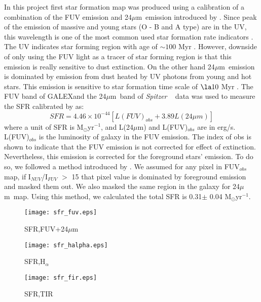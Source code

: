\documentclass[useAMS,usenatbib]{mn2e}
\newcommand \halpha    {H$\alpha $\ }
\newcommand \um    {$\mu$m\ }
\newcommand \Spitzer {{\it Spitzer }}
\newcommand \Galex {GALEX}
\begin{document}
In this project first star formation map was produced using a calibration of a combination of the FUV emission and 24\um emission introduced by \cite{Hao11}. Since peak of the emission of massive and young stars (O - B and A type) are in the UV, this wavelength is one of the most common used star formation rate indicators \citep[e.g.,][]{Kennicutt89}. The UV indicates star forming region with age of $\sim 100$ Myr \citep[e.g.,][]{Kennicutt98a, Calzetti05}. However, downside of only using the FUV light as a tracer of star forming region is that this emission is really sensitive to dust extinction. On the other hand 24\um emission is dominated by emission from dust heated by UV photons from young and hot stars. This emission is sensitive to star formation time scale of $\la10$ Myr \citep{Calzetti07}.
The FUV band of \Galex and the 24\um band of \Spitzer ~ data was used to measure the SFR calibrated by \cite{Hao11} as:
\begin{equation}
\label{equ: fuvplus24}
SFR =4.46\times10^{-44}[L(FUV)_{obs}+3.89L(24\mu m)]
\end{equation}
where a unit of SFR is M$_{\odot}$yr$^{-1}$, and L(24$\mu$m) and L(FUV)$_{obs}$ are in erg/s. L(FUV)$_{obs}$ is the luminosity of galaxy in the FUV emission. The index of obs is shown to indicate that the FUV emission is not corrected for effect of extinction. Nevertheless, this emission is corrected for the foreground stars' emission. To do so, we followed a method introduced by \cite{Leroy08}. We assumed for any pixel in FUV$_{obs}$ map, %
if I$_{NUV}$/I$_{FUV}$ $>$ 15 that pixel value is dominated by foreground emission and masked them out. We also masked the same region in the galaxy for 24\um map. Using this method, we calculated the total SFR is 0.31$\pm$ 0.04 M$_{\odot}$yr$^{-1}$.


\begin{figure*}
    \centering
    \begin{subfigure}[b]{1\textwidth}
        \centering
        \texttt{[image: sfr\_fuv.eps]}
        \caption{SFR,FUV+24\um}
        \label{fig:sfr,fuv}
    \end{subfigure}
    \hfill
    \begin{subfigure}[b]{1\textwidth}
        \centering
        \texttt{[image: sfr\_halpha.eps]}
        \caption{SFR,H$_{\alpha}$}
        \label{fig:sfr_halpha}
    \end{subfigure}
    \hfill
    \begin{subfigure}[b]{1\textwidth}
        \centering
        \texttt{[image: sfr\_fir.eps]}
        \caption{SFR,TIR}
        \label{fig:sfr,fir}
    \end{subfigure}
    \caption{SFR map from a combination of FUV + 24\um emission (top), \halpha and 24\um emission (middle), and total infrared emission (bottom)}
    \label{fig:sfrs}
\end{figure*}
\end{document}
